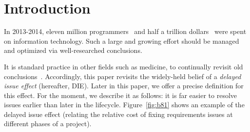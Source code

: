\documentclass{sig-alternate}
\newcommand{\fig}[1]{Figure~\ref{fig:#1}}
\begin{document}
\section{Introduction}
In 2013-2014, 
eleven  million programmers~\cite{pettey14} and
half a trillion dollars~\cite{avram14} were spent on information technology.
Such a large and growing effort should be managed and optimized via  well-researched conclusions.  

It is standard practice
in other fields such as medicine,
to continually revisit old conclusions~\cite{prasad13}.
Accordingly, this paper revisits
the widely-held belief of a {\em delayed issue effect} (hereafter, DIE).
Later in this paper, we offer a precise definition for this effect.
For the moment, we describe it as follows:
it is far easier to resolve issues earlier than later in the lifecycle.
 \fig{b81} shows an example of the delayed issue effect (relating
 the relative cost of fixing requirements issues at different phases of a project).
 
\end{document}
